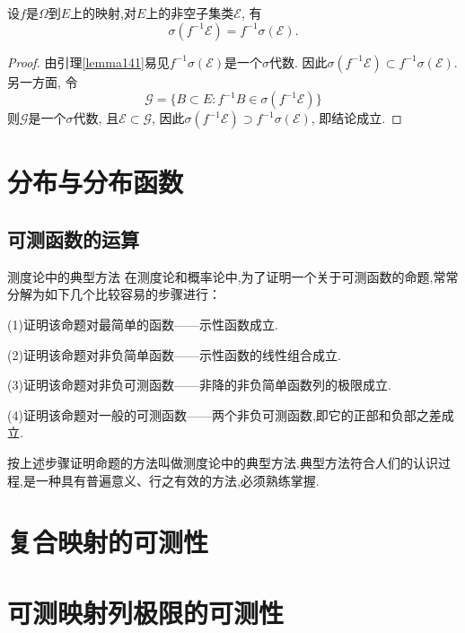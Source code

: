 \begin{theorem}
	设$f$是$\Omega$到$E$上的映射,对$E$上的非空子集类$\mathscr{E}$, 有
	\begin{equation}
	\sigma(f^{-1}\mathscr{E}) = f^{-1}\sigma(\mathscr{E}).
	\end{equation}
\end{theorem}

\begin{proof}
	由引理\ref{lemma141}易见$f^{-1}\sigma(\mathscr{E})$是一个$\sigma$代数. 因此$\sigma(f^{-1}\mathscr{E})\subset f^{-1}\sigma(\mathscr{E})$. 另一方面, 令
	\begin{equation}
	\mathscr{G} = \{ B\subset E:f^{-1}B\in\sigma(f^{-1}\mathscr{E})\}
	\end{equation}
	则$\mathscr{G}$是一个$\sigma$代数, 且$\mathscr{E}\subset\mathscr{G}$, 因此$\sigma(f^{-1}\mathscr{E})\supset f^{-1}\sigma(\mathscr{E})$, 即结论成立.
\end{proof}



\section{分布与分布函数}
\subsection{可测函数的运算}


{测度论中的典型方法}
在测度论和概率论中,为了证明一个关于可测函数的命题,常常分解为如下几个比较容易的步骤进行：
\begin{blist}
	\item (1)证明该命题对最简单的函数——示性函数成立.
	\item (2)证明该命题对非负简单函数——示性函数的线性组合成立.
	\item (3)证明该命题对非负可测函数——非降的非负简单函数列的极限成立.
	\item (4)证明该命题对一般的可测函数——两个非负可测函数,即它的正部和负部之差成立.
\end{blist}
按上述步骤证明命题的方法叫做测度论中的典型方法.典型方法符合人们的认识过程,是一种具有普遍意义、行之有效的方法,必须熟练掌握.

\section{复合映射的可测性}
\section{可测映射列极限的可测性}
